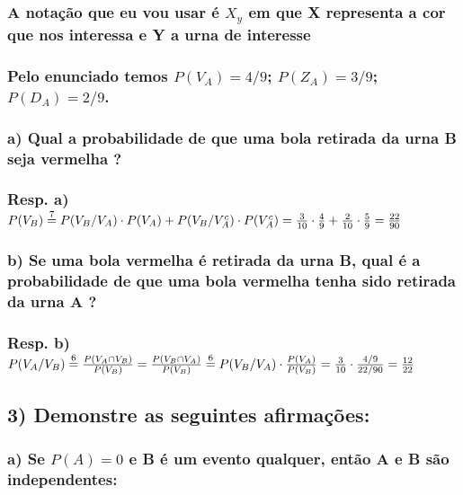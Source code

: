 \documentclass[english]{article}
\begin{document}
\subsubsection*{\textmd{A notação que eu vou usar é $X_{y}$ em que X representa
a cor que nos interessa e Y a urna de interesse}}


\subsubsection*{\textmd{Pelo enunciado temos $P(V_{A})=4/9$; $P(Z_{A})=3/9$; $P(D_{A})=2/9$. }}


\subsubsection*{\textmd{a) Qual a probabilidade de que uma bola retirada da urna
B seja vermelha ?}}


\subsubsection*{\textmd{Resp. a) $P(V_{B})\protect\overset{7}{=}P(V_{B}/V_{A})\cdot P(V_{A})+P(V_{B}/V_{A}^{c})\cdot P(V_{A}^{c})=\frac{3}{10}\cdot\frac{4}{9}+\frac{2}{10}\cdot\frac{5}{9}=\frac{22}{90}$}}


\subsubsection*{\textmd{b) Se uma bola vermelha é retirada da urna B, qual é a probabilidade
de que uma bola vermelha tenha sido retirada da urna A ?}}


\subsubsection*{\textmd{Resp. b) $P(V_{A}/V_{B})\protect\overset{6}{=}\frac{P(V_{A}\cap V_{B})}{P(V_{B})}=\frac{P(V_{B}\cap V_{A})}{P(V_{B})}\protect\overset{6}{=}P(V_{B}/V_{A})\cdot\frac{P(V_{A})}{P(V_{B})}=\frac{3}{10}\cdot\frac{4/9}{22/90}=\frac{12}{22}$}}

\textcompwordmark{}


\subsection*{\textmd{3) Demonstre as seguintes afirmações:}}


\subsubsection*{\textmd{a) Se $P(A)=0$ e B é um evento qualquer, então A e B são
independentes:}}
\end{document}
